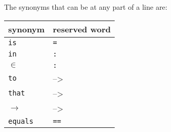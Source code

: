 \documentclass[12pt,a4paper]{article}
\newcommand{\srccode}[1]{\texttt{{#1}}}
\newcommand{\reservedWord}[1]{{\color{blue}\srccode{#1}}\xspace}
\newcommand{\sdef}{\srccode{=}}
\newcommand{\scolon}{\srccode{:}}
\newcommand{\sequalsSign}{\srccode{==}}
\newcommand{\sis}{\reservedWord{is}}
\newcommand{\scin}{\reservedWord{in}}
\newcommand{\sto}{\reservedWord{to}}
\newcommand{\sthat}{\reservedWord{that}}
\newcommand{\sequals}{\reservedWord{equals}}
\newcommand{\lambdaSymbol}{{\tiny--\textgreater}}
\begin{document}
    The synonyms that can be at any part of a line are:

    \begin{center}
        \begin{tabular}{|ll|}
            \hline
            \textbf{synonym} & \textbf{reserved word} \\
            \hline
            \sis             & \sdef                  \\
            \hline
            \scin            & \scolon                \\
            $\in$            & \scolon                \\
            \hline
            \sto             & \lambdaSymbol          \\
            \sthat           & \lambdaSymbol          \\
            $\to$            & \lambdaSymbol          \\
            \hline
            \sequals         & \sequalsSign           \\
            \hline
        \end{tabular}
    \end{center}
\end{document}
